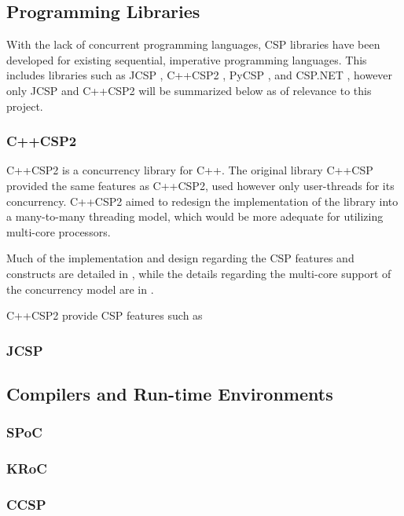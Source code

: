 \subsection{Programming Libraries}
\label{subsec:csp_prog_lib}

With the lack of concurrent programming languages, CSP libraries have been developed for existing sequential, imperative programming languages. This includes libraries such as JCSP \citep{jcsp}, C++CSP2 \citep{c++csp2}, PyCSP \citep{pycsp}, and CSP.NET \citep{cspnet}, however only JCSP and C++CSP2 will be summarized below as of relevance to this project.


\subsubsection{C++CSP2}
\label{sssec:c++csp2}

C++CSP2 \citep{c++csp2} is a concurrency library for C++. The original library C++CSP \citep{c++csp} provided the same features as C++CSP2, used however only user-threads for its concurrency. C++CSP2 aimed to redesign the implementation of the library into a many-to-many threading model, which would be more adequate for utilizing multi-core processors. 

Much of the implementation and design regarding the CSP features and constructs are detailed in \citet{c++csp}, while the details regarding the multi-core support of the concurrency model are in \citet{c++csp2}.

C++CSP2 provide CSP features such as 


\subsubsection{JCSP}
\label{sssec:jcsp}




\subsection{Compilers and Run-time Environments}
\label{subsec:csp_comp_runtime}




\subsubsection{SPoC}
\label{sssec:spoc}




\subsubsection{KRoC}
\label{sssec:kroc}




\subsubsection{CCSP}
\label{sssec:ccsp}



